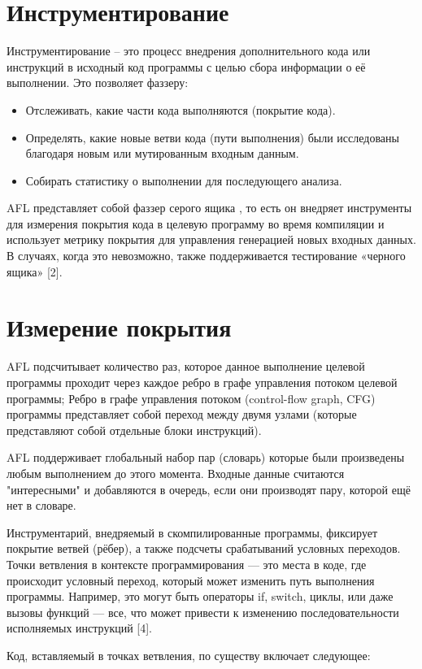 \section{Инструментирование} \label{ch3:sec1}
Инструментирование – это процесс внедрения дополнительного кода или инструкций в исходный код программы с целью сбора информации о её выполнении.
Это позволяет фаззеру:
\begin{itemize}
	\item Отслеживать, какие части кода выполняются (покрытие кода).
	\item Определять, какие новые ветви кода (пути выполнения) были исследованы благодаря новым или мутированным входным данным.
	\item Собирать статистику о выполнении для последующего анализа.
\end{itemize}
\par
AFL представляет собой фаззер серого ящика , то есть он внедряет инструменты для измерения покрытия кода в целевую программу во время компиляции и использует метрику покрытия для управления генерацией новых входных данных.
В случаях, когда это невозможно, также поддерживается тестирование «черного ящика» [2].

\section{Измерение покрытия} \label{ch3:sec2}
AFL подсчитывает количество раз, которое данное выполнение целевой программы проходит через каждое ребро в графе управления потоком целевой программы; Ребро в графе управления потоком (control-flow graph, CFG) программы представляет собой переход между двумя узлами (которые представляют собой отдельные блоки инструкций). 
\par
AFL поддерживает глобальный набор пар (словарь) которые были произведены любым выполнением до этого момента. Входные данные считаются "интересными" и добавляются в очередь, если они производят пару, которой ещё нет в словаре.
\par
Инструментарий, внедряемый в скомпилированные программы, фиксирует покрытие ветвей (рёбер), а также подсчеты срабатываний условных переходов. Точки ветвления в контексте программирования — это места в коде, где происходит условный переход, который может изменить путь выполнения программы. Например, это могут быть операторы if, switch, циклы, или даже вызовы функций — все, что может привести к изменению последовательности исполняемых инструкций [4]. 
\par
Код, вставляемый в точках ветвления, по существу включает следующее:

